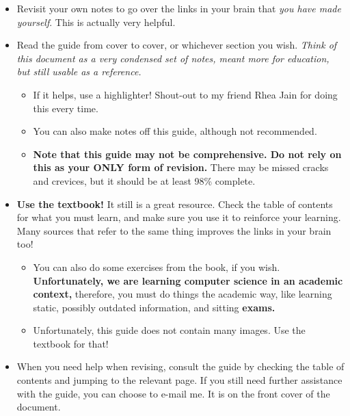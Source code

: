 \documentclass[../main.tex]{subfiles}
\begin{document}
\begin{itemize}
    \item Revisit your own notes to go over the links in your brain that \emph{you have made yourself}. This is actually very helpful.
    \item Read the guide from cover to cover, or whichever section you wish. \emph{Think of this document as a very condensed set of notes, meant more for education, but still usable as a reference.}
        \begin{itemize}
            \item If it helps, use a highlighter! Shout-out to my friend Rhea Jain for doing this every time.
            \item You can also make notes off this guide, although not recommended.
            \item \textbf{Note that this guide may not be comprehensive. Do not rely on this as your ONLY form of revision.} There may be missed cracks and crevices, but it should be at least 98\% complete.
        \end{itemize}
    \item \textbf{Use the textbook!} It still is a great resource. Check the table of contents for what you must learn, and make sure you use it to reinforce your learning. Many sources that refer to the same thing improves the links in your brain too!
        \begin{itemize}
            \item You can also do some exercises from the book, if you wish. \textbf{Unfortunately, we are learning computer science in an academic context,} therefore, you must do things the academic way, like learning static, possibly outdated information, and sitting \textbf{exams.}
            \item Unfortunately, this guide does not contain many images. Use the textbook for that!
        \end{itemize}
    \item When you need help when revising, consult the guide by checking the table of contents and jumping to the relevant page. If you still  need further assistance with the guide, you can choose to e-mail me. It is on the front cover of the document.
\end{itemize}
\end{document}
